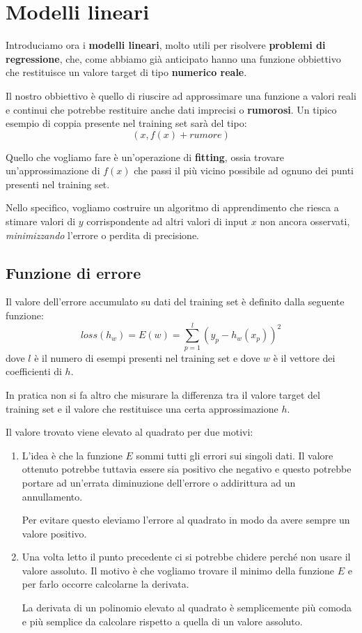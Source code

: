 \chapter{Modelli lineari}
Introduciamo ora i \textbf{modelli lineari}, molto utili per risolvere \textbf{problemi di regressione}, che, come
abbiamo gi\`a anticipato hanno una funzione obbiettivo che restituisce un valore target di tipo \textbf{numerico reale}.

Il nostro obbiettivo \`e quello di riuscire ad approssimare una funzione a valori reali e continui che potrebbe restituire
anche dati imprecisi o \textbf{rumorosi}. Un tipico esempio di coppia presente nel training set sar\`a del tipo:
\[ (x, f(x) + rumore) \]

Quello che vogliamo fare \`e un'operazione di \textbf{fitting}, ossia trovare un'approssimazione di $f(x)$ che passi il
pi\`u vicino possibile ad ognuno dei punti presenti nel training set.

Nello specifico, vogliamo costruire un algoritmo di apprendimento che riesca a stimare valori di  $y$ corrispondente ad
altri valori di input $x$ non ancora osservati, \emph{minimizzando} l'errore o perdita di precisione.

\section{Funzione di errore}
Il valore dell'errore accumulato su dati del training set \`e definito dalla seguente funzione:
\[ loss(h_w) = E(w) = \sum_{p=1}^l (y_p - h_w(x_p))^2 \]
dove $l$ \`e il numero di esempi presenti nel training set e dove $w$ \`e il vettore dei coefficienti di $h$.

In pratica non si fa altro che misurare la differenza tra il valore target del training set e il valore che restituisce
una certa approssimazione $h$.

Il valore trovato viene elevato al quadrato per due motivi:
\begin{enumerate}
	\item L'idea \`e che la funzione $E$ sommi tutti gli errori sui singoli dati. Il valore ottenuto potrebbe tuttavia
	      essere sia positivo che negativo e questo potrebbe portare ad un'errata diminuzione dell'errore o addirittura
	      ad un annullamento.

	      Per evitare questo eleviamo l'errore al quadrato in modo da avere sempre un valore positivo.
	\item Una volta letto il punto precedente ci si potrebbe chidere perch\'e non usare il valore assoluto. Il motivo \`e
	      che vogliamo trovare il minimo della funzione $E$ e per farlo occorre calcolarne la derivata.

	      La derivata di un  polinomio elevato al quadrato \`e semplicemente pi\`u comoda e pi\`u semplice da calcolare
	      rispetto a quella di un valore assoluto.
\end{enumerate}

